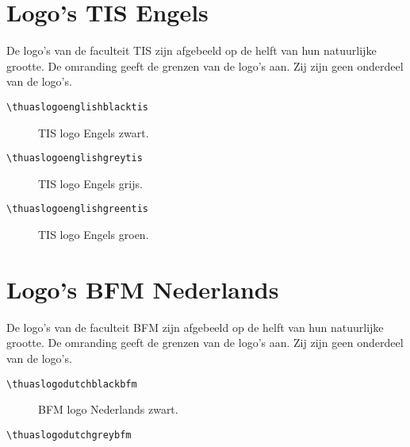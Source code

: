 \documentclass[a4paper,12pt]{article}
\begin{document}
\section{Logo's TIS Engels}
De logo's van de faculteit TIS zijn afgebeeld op de helft van hun natuurlijke grootte.
De omranding geeft de grenzen van de logo's aan. Zij zijn geen onderdeel
van de logo's.

\begin{verbatim}
\thuaslogoenglishblacktis
\end{verbatim}

\begin{figure}[H]
\centering\fboxsep=0pt%
\fbox{%
\scalebox{0.7071}{\thuaslogoenglishblacktis}}
\caption{TIS logo Engels zwart.}
\end{figure}

\begin{verbatim}
\thuaslogoenglishgreytis
\end{verbatim}

\begin{figure}[H]
\centering\fboxsep=0pt%
\fbox{%
\scalebox{0.7071}{\thuaslogoenglishgreytis}}
\caption{TIS logo Engels grijs.}
\end{figure}

\begin{verbatim}
\thuaslogoenglishgreentis
\end{verbatim}

\begin{figure}[H]
\centering\fboxsep=0pt%
\fbox{%
\scalebox{0.7071}{\thuaslogoenglishgreentis}}
\caption{TIS logo Engels groen.}
\end{figure}


\section{Logo's BFM Nederlands}
De logo's van de faculteit BFM zijn afgebeeld op de helft van hun natuurlijke grootte.
De omranding geeft de grenzen van de logo's aan. Zij zijn geen onderdeel
van de logo's.

\begin{verbatim}
\thuaslogodutchblackbfm
\end{verbatim}

\begin{figure}[H]
\centering\fboxsep=0pt%
\fbox{%
\scalebox{0.7071}{\thuaslogodutchblackbfm}}
\caption{BFM logo Nederlands zwart.}
\end{figure}

\begin{verbatim}
\thuaslogodutchgreybfm
\end{verbatim}
\end{document}
